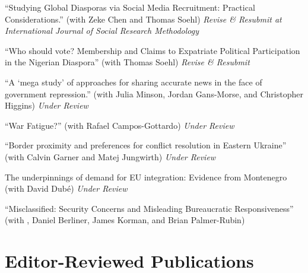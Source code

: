\documentclass[margin,line]{res}
\begin{document}
\begin{etaremune}

\item ``Studying Global Diasporas via Social Media Recruitment: Practical Considerations.'' (with Zeke Chen and Thomas Soehl) \textit{ Revise \& Resubmit at  International Journal of Social Research Methodology}

\item{``Who should vote? Membership and Claims to Expatriate Political Participation in the Nigerian Diaspora''} (with Thomas Soehl) \textit{ Revise \& Resubmit}

\item ``A `mega study' of approaches for sharing accurate news in the face of government repression.'' (with Julia Minson, Jordan Gans-Morse, and Christopher Higgins) \textit{Under Review}

\item ``War Fatigue?'' (with Rafael Campos-Gottardo) \textit{Under Review}

\item ``Border proximity and preferences for conflict resolution in Eastern Ukraine'' (with Calvin Garner and Matej Jungwirth)  \textit{Under Review}

\item The underpinnings of demand for EU integration: Evidence from Montenegro (with David Dubé)  \textit{Under Review}

\item ``Misclassified: Security Concerns and Misleading Bureaucratic Responsiveness'' (with , Daniel Berliner, James Korman, and Brian Palmer-Rubin)

\end{etaremune}


\renewcommand{\labelenumi}{\theenumi.}
\section{\sc Editor-Reviewed Publications}
\end{document}
